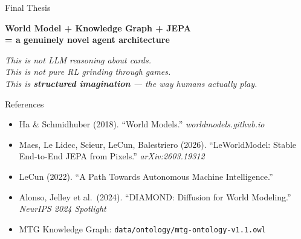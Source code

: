 \documentclass[aspectratio=169, 11pt]{beamer}
\begin{document}
\begin{frame}{Final Thesis}
  \begin{center}
    \large\bfseries World Model + Knowledge Graph + JEPA\\= a genuinely novel agent architecture
  \end{center}
  \vspace{0.3cm}
  \vspace{0.4cm}
  \begin{center}
    \textit{This is not LLM reasoning about cards.\\
    This is not pure RL grinding through games.\\
    This is \textbf{structured imagination} --- the way humans actually play.}
  \end{center}
\end{frame}

\begin{frame}{References}
  \footnotesize
  \begin{itemize}
    \item Ha \& Schmidhuber (2018). ``World Models.'' \textit{worldmodels.github.io}
    \item Maes, Le Lidec, Scieur, LeCun, Balestriero (2026).
          ``LeWorldModel: Stable End-to-End JEPA from Pixels.'' \textit{arXiv:2603.19312}
    \item LeCun (2022). ``A Path Towards Autonomous Machine Intelligence.''
    \item Alonso, Jelley et al.\ (2024). ``DIAMOND: Diffusion for World Modeling.'' \textit{NeurIPS 2024 Spotlight}
    \item MTG Knowledge Graph: \texttt{data/ontology/mtg-ontology-v1.1.owl}
  \end{itemize}
\end{frame}
\end{document}
